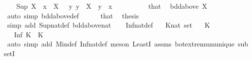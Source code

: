 \begin{isabellebody}
\ \ \isamarkupfalse%
\ {\isachardoublequoteopen}Sup\ X\ {\isasymle}\ x{\isachardoublequoteclose}\ \ {\isachardoublequoteopen}X\ {\isasymnoteq}\ {\isacharbraceleft}{\kern0pt}{\isacharbraceright}{\kern0pt}{\isachardoublequoteclose}\ {\isachardoublequoteopen}{\isasymAnd}y{\isachardot}{\kern0pt}\ y\ {\isasymin}\ X\ {\isasymLongrightarrow}\ y\ {\isasymle}\ x{\isachardoublequoteclose}\isanewline
\ \ \isamarkupfalse%
\ {\isacharminus}{\kern0pt}\isanewline
\ \ \ \ \isamarkupfalse%
\ that\ \isamarkupfalse%
\ {\isachardoublequoteopen}bdd{\isacharunderscore}{\kern0pt}above\ X{\isachardoublequoteclose}\isanewline
\ \ \ \ \ \ \isamarkupfalse%
\ {\isacharparenleft}{\kern0pt}auto\ simp{\isacharcolon}{\kern0pt}\ bdd{\isacharunderscore}{\kern0pt}above{\isacharunderscore}{\kern0pt}def{\isacharparenright}{\kern0pt}\isanewline
\ \ \ \ \isamarkupfalse%
\ that\ \isamarkupfalse%
\ {\isacharquery}{\kern0pt}thesis\ \isanewline
\ \ \ \ \ \ \isamarkupfalse%
\ {\isacharparenleft}{\kern0pt}simp\ add{\isacharcolon}{\kern0pt}\ Sup{\isacharunderscore}{\kern0pt}nat{\isacharunderscore}{\kern0pt}def\ bdd{\isacharunderscore}{\kern0pt}above{\isacharunderscore}{\kern0pt}nat{\isacharparenright}{\kern0pt}\isanewline
\ \ \isamarkupfalse%
\isanewline
{}\isamarkupfalse%
%
\endisatagproof
{\isafoldproof}%
%
\isadelimproof
\isanewline
%
\endisadelimproof
\isanewline
{}\isamarkupfalse%
\isanewline
\isanewline
{}\isamarkupfalse%
\ Inf{\isacharunderscore}{\kern0pt}nat{\isacharunderscore}{\kern0pt}def{}{\isacharcolon}{\kern0pt}\isanewline
\ \ \ K{\isacharcolon}{\kern0pt}{\isacharcolon}{\kern0pt}{\isachardoublequoteopen}nat\ set{\isachardoublequoteclose}\isanewline
\ \ \ {\isachardoublequoteopen}K\ {\isasymnoteq}\ {\isacharbraceleft}{\kern0pt}{\isacharbraceright}{\kern0pt}{\isachardoublequoteclose}\isanewline
\ \ \ {\isachardoublequoteopen}Inf\ K\ {\isasymin}\ K{\isachardoublequoteclose}\isanewline
%
\isadelimproof
%
\endisadelimproof
%
\isatagproof
{}\isamarkupfalse%
\ {\isacharparenleft}{\kern0pt}auto\ simp\ add{\isacharcolon}{\kern0pt}\ Min{\isacharunderscore}{\kern0pt}def\ Inf{\isacharunderscore}{\kern0pt}nat{\isacharunderscore}{\kern0pt}def{\isacharparenright}{\kern0pt}\ {\isacharparenleft}{\kern0pt}meson\ LeastI\ assms\ bot{\isachardot}{\kern0pt}extremum{\isacharunderscore}{\kern0pt}unique\ subsetI{\isacharparenright}{\kern0pt}%

\end{isabellebody}
